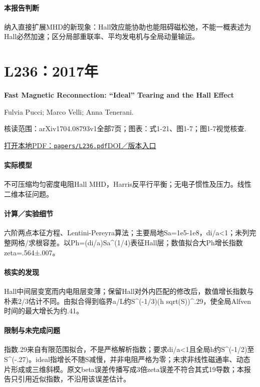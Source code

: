 \paragraph{本报告判断}纳入直接扩展MHD的新现象：Hall效应能协助也能阻碍磁松弛，不能一概表述为Hall必然加速；区分局部重联率、平均发电机与全局动量输运。

\section{L236：2017年}\label{paper:L236}

\textbf{Fast Magnetic Reconnection: “Ideal” Tearing and the Hall Effect}\citep{L236}\

Fulvia Pucci;  Marco Velli;  Anna Tenerani.

\textsf{核读范围：}arXiv1704.08793v1全部7页；\textsf{图表：}式1-21、图1-7；图1-7视觉核查.

\href{run:papers/L236.pdf}{打开本地PDF：\texttt{papers/L236.pdf}}\quad\href{https://doi.org/10.3847/1538-4357/aa7b82}{DOI／版本入口}

\paragraph{实际模型}不可压缩均匀密度电阻Hall MHD，Harris反平行平衡；无电子惯性及压力。线性二维本征问题。

\paragraph{计算／实验细节}六阶两点本征方程、Lentini-Pereyra算法；主要局地Sa=1e5-1e8，di/a<1；未列完整网格/求根容差。以Ph=(di/a)Sa\textasciicircum{}(1/4)表征Hall层；数值拟合大Ph增长指数zeta=.564±.007。

\paragraph{核实的发现}Hall中间层变宽而内电阻层变薄；保留Hall对外内匹配的修改后，数值增长指数与朴素2/3估计不同。由拟合得到临界a/L约S\textasciicircum{}(-1/3)(h sqrt(S))\textasciicircum{}.29，使全局Alfven时间的最大增长为约.41。

\paragraph{限制与未完成问题}指数.29来自有限范围拟合，不是严格解析指数；要求di/a<1且全局h约S\textasciicircum{}(-1/2)至S\textasciicircum{}(-.27)。ideal指增长不随S减慢，并非电阻严格为零；未求非线性磁通率、动态片形成或三维斜模。原文beta误差传播写成3倍zeta误差不符合其式19导数；本报告只引用近似指数，不沿用该误差估计。

